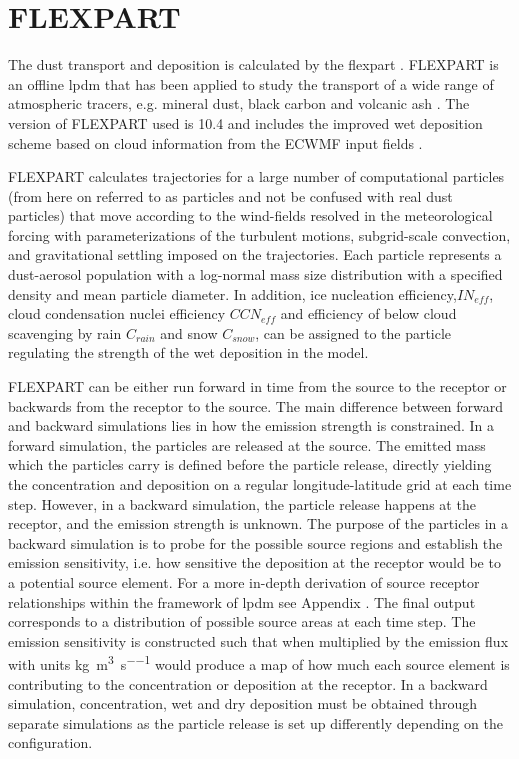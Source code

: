 \section{FLEXPART}
\par The dust transport and deposition is calculated by the \acrfull{flexpart} \parencite{Flexpart10.4_ref}. FLEXPART is an offline \acrshort{lpdm} that has been applied to study the transport of a wide range of atmospheric tracers, e.g. mineral dust, black carbon and volcanic ash \parencite{flexdust_ref_2016,choi_investigation_2020, eckhardt2008estimation}. 
The version of FLEXPART used is 10.4 and includes the improved wet deposition scheme based on cloud information from the ECWMF input fields \parencite{flexpart_wetdep}. 
\par FLEXPART calculates trajectories for a large number of computational particles (from here on referred to as particles and not be confused with real dust particles) that move according to the wind-fields resolved in the meteorological forcing with parameterizations of the turbulent motions, subgrid-scale convection, and gravitational settling imposed on the trajectories. 
Each particle represents a dust-aerosol population with a log-normal mass size distribution with a specified density and mean particle diameter. 
In addition, ice nucleation efficiency,$IN_{eff}$, cloud condensation nuclei efficiency $CCN_{eff}$ and efficiency of below cloud scavenging by rain $C_{rain}$ and snow $C_{snow}$, can be assigned to the particle regulating the strength of the wet deposition in the model.   

FLEXPART can be either run forward in time from the source to the receptor or backwards from the receptor to the source. The main difference between forward and backward simulations lies in how the emission strength is constrained. 
In a forward simulation, the particles are released at the source. 
The emitted mass which the particles carry is defined before the particle release, directly yielding the concentration and deposition on a regular longitude-latitude grid at each time step.
However, in a backward simulation, the particle release happens at the receptor, and the emission strength is unknown. 
The purpose of the particles in a backward simulation is to probe for the possible source regions and establish the emission sensitivity, i.e. how sensitive the deposition at the receptor would be to a potential source element. 
For a more in-depth derivation of source receptor relationships within the framework of \acrshort{lpdm} see Appendix . The final output corresponds to a distribution of possible source areas at each time step.
The emission sensitivity is constructed such that when multiplied by the emission flux with units \si{\kg\per\cubic\metre\per\s} would produce a map of how much each source element is contributing to the concentration or deposition at the receptor.
In a backward simulation, concentration, wet and dry deposition must be obtained through separate simulations as the particle release is set up differently depending on the configuration.  
